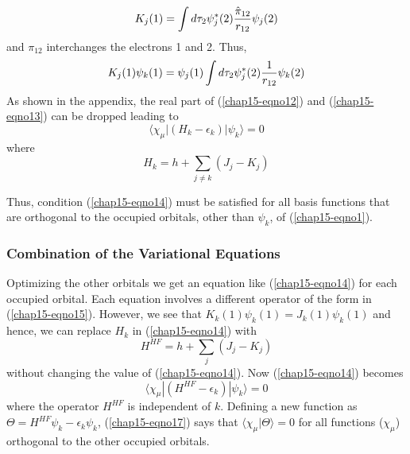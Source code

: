\begin{equation}
K_j (1) = \int d \tau_2 \psi^*_j (2) {{\hat \pi}_{12} \over r_{12}} 
\psi_j(2)
\end{equation}
and $\pi_{12}$ interchanges the electrons 1 and 2.  Thus,
\begin{equation}
K_j (1) \psi_k (1) = \psi_j (1) \int d \tau_2 \psi^*_j (2) {1 \over 
r_{12}} \psi_k (2)
\end{equation}
As shown in the appendix, the real part of (\ref{chap15-eqno12}) and
(\ref{chap15-eqno13}) can be dropped leading to
\begin{equation}
\langle \chi_{\mu} | \left( H_k - \epsilon_k \right) | \psi_k 
\rangle = 0
\label{chap15-eqno14}
\end{equation}
where
\begin{equation}
H_k = h + \sum_{j \not= k} \left( J_j - K_j \right)
\label{chap15-eqno15}
\end{equation}

Thus, condition (\ref{chap15-eqno14}) must be satisfied for all basis
functions that are orthogonal to the occupied orbitals, other than
$\psi_k$, of (\ref{chap15-eqno1}).

\subsubsection{Combination of the Variational Equations}

Optimizing the other orbitals we get an equation like
(\ref{chap15-eqno14}) for each occupied orbital.  Each equation
involves a different operator of the form in (\ref{chap15-eqno15}).
However, we see that $K_k (1) \psi_k (1) = J_k (1) \psi_k (1)$ and
hence, we can replace $H_k$ in (\ref{chap15-eqno14}) with
\begin{equation}
H^{HF} = h + \sum_{j} \left( J_j - K_j \right)
\label{chap15-eqno16}
\end{equation}
without changing the value of (\ref{chap15-eqno14}).  Now
(\ref{chap15-eqno14}) becomes
\begin{equation}
\langle \chi_{\mu} \left| \left( H^{HF} - \epsilon_k \right) \right| \psi_k 
\rangle = 0
\label{chap15-eqno17}
\end{equation}
where the operator $H^{HF}$ is independent of $k$.  Defining a new
function as $\Theta = H^{HF} \psi_k - \epsilon_k \psi_k$,
(\ref{chap15-eqno17}) says that $\langle \chi_{\mu} | \Theta \rangle =
0$ for all functions ($\chi_{\mu}$) orthogonal to the other occupied
orbitals.

